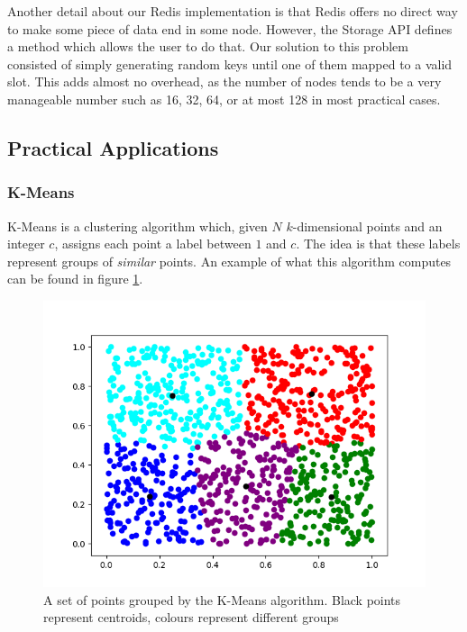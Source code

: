 Another detail about our Redis implementation is that Redis offers no direct way to make some piece of data end in some node. However, the Storage API defines a method which allows the user to do that. Our solution to this problem consisted of simply generating random keys until one of them mapped to a valid slot. This adds almost no overhead, as the number of nodes tends to be a very manageable number such as 16, 32, 64, or at most 128 in most practical cases.

\subsection{Practical Applications}
\label{subsec:storage_apps}
\subsubsection{K-Means}
\label{subsubsec:kmeans_redis}
K-Means \cite{Lloyd82leastsquares} is a clustering algorithm which, given $N$ $k$-dimensional points and an integer $c$, assigns each point a label between $1$ and $c$. The idea is that these labels represent groups of \textit{similar} points. An example of what this algorithm computes can be found in figure \ref{fig:kmeans_example}.

\begin{figure}
\centering
\includegraphics[scale = 0.5]{figures/kmeans_example.png}
\caption{A set of points grouped by the K-Means algorithm. Black points represent centroids, colours represent different groups}
\label{fig:kmeans_example}
\end{figure}

